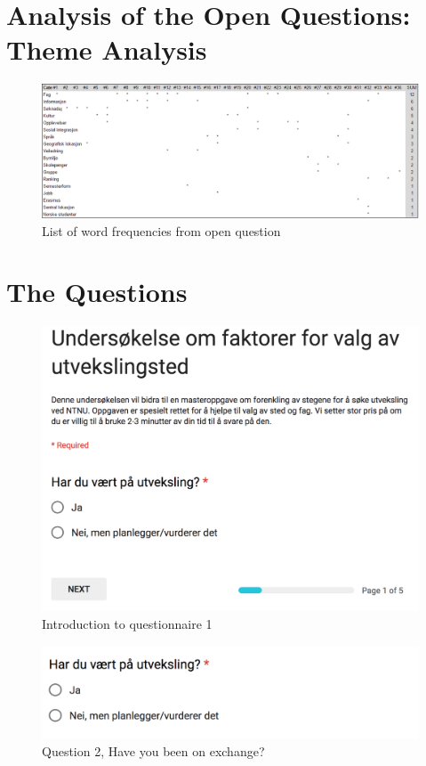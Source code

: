 \FloatBarrier
\section{Analysis of the Open Questions: Theme Analysis}
\label{appendix:word_frequency}

\begin{figure}[h]
    \centering
    \includegraphics[width=1.0\textwidth]{fig/word_freq.png}
    \caption[]{List of word frequencies from open question}
    \label{fig:word_frequency}
\end{figure}

\FloatBarrier
\section{The Questions} 

\begin{figure}[h]
    \centering
\includegraphics[width=1\textwidth]{fig/form1/intro.png}
    \caption[]{Introduction to questionnaire 1}
    \label{fig:q11}
\end{figure}

\begin{figure}[h]
    \centering
    
\includegraphics[width=1\textwidth]{fig/form1/exchange.png}
    \caption[]{Question 2, Have you been on exchange?}
    \label{fig:q12}
\end{figure}

